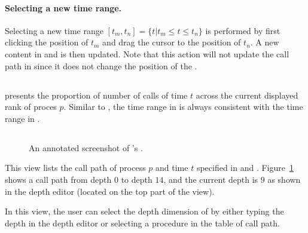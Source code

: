 \paragraph{Selecting a new time range.} Selecting a new time range $[t_m,t_n]= \{t | t_m\leq t\leq t_n\}$ is performed by first clicking the position of $t_m$ and drag the cursor to the position of $t_n$. A new content in \depthview{} and \traceview{} is then updated. Note that this action will not update the call path in \callview{} since it does not change the position of the \crosshair.


\subsection{\summaryview}
\label{sec:summaryview}

\summaryview{} presents the proportion of number of calls of time $t$ across the current displayed rank of proces $p$. 
Similar to \depthview, the time range in \summaryview{} is always consistent with the time range in \traceview{}.


\subsection{\callview}
\label{sec:callview}

\begin{figure}[t]
\caption{An annotated screenshot of \hpctraceviewer{}'s \callview.}
\label{fig:hpctraceviewer-callpath-legend}
\end{figure}

This view lists the call path of process $p$ and time $t$ specified in \traceview{} and \depthview.
Figure~\ref{fig:hpctraceviewer-callpath-legend} shows a call path from depth $0$ to depth $14$, and the current depth is $9$ as shown in the depth editor (located on the top part of the view).

In this view, the user can select the depth dimension of \traceview{} by either typing the depth in the depth editor or selecting a procedure in the table of call path.

